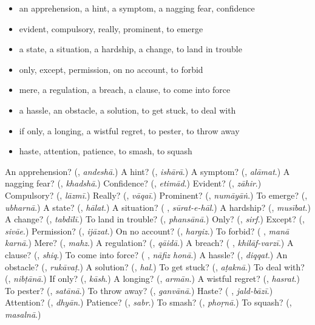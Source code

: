 \begin{itemize}
\raggedright
  \item an apprehension, a hint, a symptom, a nagging fear, confidence
  \item evident, compulsory, really, prominent, to emerge
  \item a state, a situation, a hardship, a change, to land in trouble
  \item only, except, permission, on no account, to forbid
  \item mere, a regulation, a breach, a clause, to come into force
  \item a hassle, an obstacle, a solution, to get stuck, to deal with
  \item if only, a longing, a wistful regret, to pester, to throw away
  \item haste, attention, patience, to smash, to squash
\end{itemize}

\begin{tcolorbox}[breakable,colback=teal!4,colframe=teal!35!black,title={Before you move on}]
An apprehension? (\textbf{}, \emph{andeshā}.) A hint? (\textbf{}, \emph{ishārā}.) A symptom? (\textbf{}, \emph{alāmat}.) A nagging fear? (\textbf{}, \emph{khadshā}.) Confidence? (\textbf{}, \emph{etimād}.) Evident? (\textbf{}, \emph{zāhir}.) Compulsory? (\textbf{}, \emph{lāzmī}.) Really? (\textbf{}, \emph{vāqaī}.) Prominent? (\textbf{}, \emph{numāyāṅ}.) To emerge? (\textbf{}, \emph{ubharnā}.) A state? (\textbf{}, \emph{hālat}.) A situation? (\textbf{ }, \emph{sūrat-e-hāl}.) A hardship? (\textbf{}, \emph{musībat}.) A change? (\textbf{}, \emph{tabdīlī}.) To land in trouble? (\textbf{}, \emph{phansānā}.) Only? (\textbf{}, \emph{sirf}.) Except? (\textbf{}, \emph{sivāe}.) Permission? (\textbf{}, \emph{ijāzat}.) On no account? (\textbf{}, \emph{hargiz}.) To forbid? (\textbf{ }, \emph{manā karnā}.) Mere? (\textbf{}, \emph{mahz}.) A regulation? (\textbf{}, \emph{qāidā}.) A breach? (\textbf{ }, \emph{khilāf-varzī}.) A clause? (\textbf{}, \emph{shiq}.) To come into force? (\textbf{ }, \emph{nāfiz honā}.) A hassle? (\textbf{}, \emph{diqqat}.) An obstacle? (\textbf{}, \emph{rukāvaṭ}.) A solution? (\textbf{}, \emph{hal}.) To get stuck? (\textbf{}, \emph{aṭaknā}.) To deal with? (\textbf{}, \emph{nibṭānā}.) If only? (\textbf{}, \emph{kāsh}.) A longing? (\textbf{}, \emph{armān}.) A wistful regret? (\textbf{}, \emph{hasrat}.) To pester? (\textbf{}, \emph{satānā}.) To throw away? (\textbf{}, \emph{ganvānā}.) Haste? (\textbf{ }, \emph{jald-bāzī}.) Attention? (\textbf{}, \emph{dhyān}.) Patience? (\textbf{}, \emph{sabr}.) To smash? (\textbf{}, \emph{phoṛnā}.) To squash? (\textbf{}, \emph{masalnā}.)
\end{tcolorbox}
